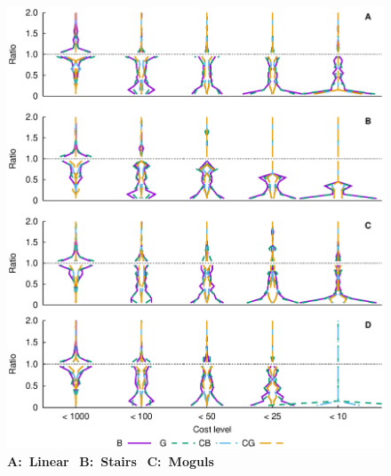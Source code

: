 \documentclass[a4paper,12pt]{article}
\theoremstyle{plain}
\theoremstyle{definition}
\begin{document}



   \pagebreak
   \begin{figure}[H]
      \vspace{-2cm}
      \hspace{-1cm}
      \includegraphics[trim=0 3.8cm 0 0,width=1.1\textwidth]{multihisto} %
      \captionsetup{width=1.\textwidth}
      \caption{
         \textbf{A:~Linear} \ \textbf{B:~Stairs} \ \textbf{C:~Moguls} \
}
\end{figure}
\end{document}
